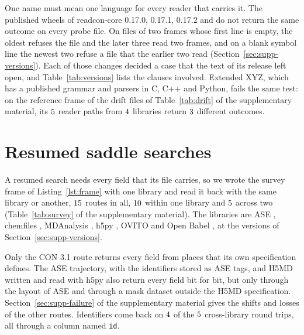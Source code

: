 \documentclass[preprint,12pt]{elsarticle}
\begin{document}
One name must mean one language for every reader that carries it.
The published wheels of readcon-core 0.17.0, 0.17.1, 0.17.2 and \rcDriftFourth{} do not return the same outcome on every probe file.
On files of two frames whose first line is empty, the oldest refuses the file and the later three read two frames, and on a blank symbol line the newest two refuse a file that the earlier two read (Section~\ref*{sec:supp-versions}).
Each of those changes decided a case that the text of its release left open, and Table~\ref*{tab:versions} lists the clauses involved.
Extended XYZ, which has a published grammar \cite{kermodeLibatomsExtxyzV0462026} and parsers in C, C++ and Python, fails the same test: on the reference frame of the drift files of Table~\ref{tab:drift} of the supplementary material, its \(5\) reader paths from \(4\) libraries return \(3\) different outcomes.


\section{Resumed saddle searches}\label{sec:cases} A resumed search needs every field that its file carries, so we wrote the survey frame of Listing~\ref{lst:frame} with one library and read it back with the same library or another, \(15\) routes in all, \(10\) within one library and \(5\) across two (Table~\ref{tab:survey} of the supplementary material).
The libraries are ASE \cite{larsenAtomicSimulationEnvironmenta2017}, chemfiles \cite{frauxChemfileschemfilesVersion01042023}, MDAnalysis \cite{gowersMdanalysisPythonPackage2016,gowersMdanalysismdanalysisRelease21002025}, h5py \cite{collettePythonHdf52013}, OVITO \cite{stukowskiVisualizationAnalysisAtomistic2010} and Open Babel \cite{oboyleOpenBabelOpen2011}, at the versions of Section~\ref*{sec:supp-versions}.

Only the CON 3.1 route returns every field from places that its own specification defines.
The ASE trajectory, with the identifiers stored as ASE tags, and H5MD written and read with h5py also return every field bit for bit, but only through the layout of ASE and through a mask dataset outside the H5MD specification.
Section~\ref*{sec:supp-failure} of the supplementary material gives the shifts and losses of the other routes.
Identifiers come back on \(4\) of the \(5\) cross-library round trips, all through a column named \texttt{id}.
\end{document}
